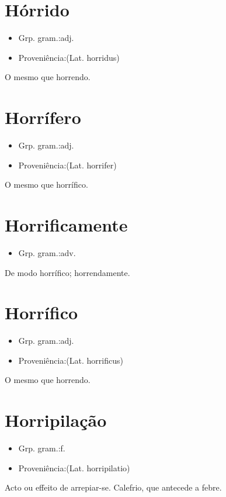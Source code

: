 \documentclass{article}
\begin{document}
\section{Hórrido}
\begin{itemize}
\item {Grp. gram.:adj.}
\end{itemize}
\begin{itemize}
\item {Proveniência:(Lat. \textunderscore horridus\textunderscore )}
\end{itemize}
O mesmo que \textunderscore horrendo\textunderscore .
\section{Horrífero}
\begin{itemize}
\item {Grp. gram.:adj.}
\end{itemize}
\begin{itemize}
\item {Proveniência:(Lat. \textunderscore horrifer\textunderscore )}
\end{itemize}
O mesmo que \textunderscore horrífico\textunderscore .
\section{Horrificamente}
\begin{itemize}
\item {Grp. gram.:adv.}
\end{itemize}
De modo horrífico; horrendamente.
\section{Horrífico}
\begin{itemize}
\item {Grp. gram.:adj.}
\end{itemize}
\begin{itemize}
\item {Proveniência:(Lat. \textunderscore horrificus\textunderscore )}
\end{itemize}
O mesmo que \textunderscore horrendo\textunderscore .
\section{Horripilação}
\begin{itemize}
\item {Grp. gram.:f.}
\end{itemize}
\begin{itemize}
\item {Proveniência:(Lat. \textunderscore horripilatio\textunderscore )}
\end{itemize}
Acto ou effeito de arrepiar-se.
Calefrio, que antecede a febre.
\end{document}
